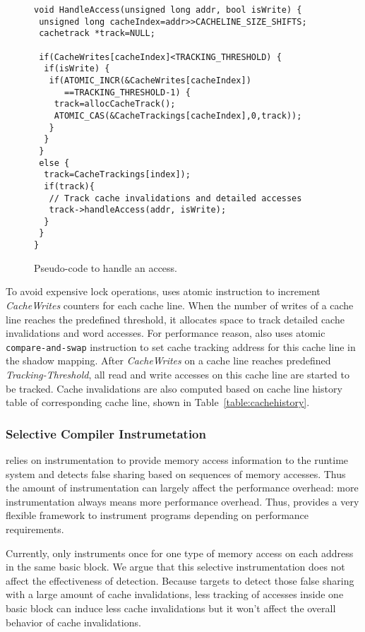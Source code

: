\begin{figure}[!t]
\begin{lstlisting}
void HandleAccess(unsigned long addr, bool isWrite) {
 unsigned long cacheIndex=addr>>CACHELINE_SIZE_SHIFTS;
 cachetrack *track=NULL;

 if(CacheWrites[cacheIndex]<TRACKING_THRESHOLD) {
  if(isWrite) {
   if(ATOMIC_INCR(&CacheWrites[cacheIndex]) 
      ==TRACKING_THRESHOLD-1) {
    track=allocCacheTrack();
    ATOMIC_CAS(&CacheTrackings[cacheIndex],0,track));
   }
  } 
 }
 else {
  track=CacheTrackings[index]);
  if(track){
   // Track cache invalidations and detailed accesses
   track->handleAccess(addr, isWrite);
  }
 }
}
\end{lstlisting}
\caption{Pseudo-code to handle an access.\label{fig:algorithm}}
\end{figure}

To avoid expensive lock operations,  uses atomic instruction to increment 
{\it CacheWrites} counters for each cache line. 
When the number of writes of a cache line reaches the predefined threshold,
it allocates space to track detailed cache invalidations and word accesses.
For performance reason,  also 
uses atomic \texttt{compare-and-swap} instruction to set cache tracking address for this cache line in
the shadow mapping.
After {\it CacheWrites} on a cache line reaches predefined {\it Tracking-Threshold}, 
all read and write accesses on this cache line are started to be tracked.
Cache invalidations are also computed based on cache line history table of corresponding
cache line, shown in Table~\ref{table:cachehistory}. 


\subsubsection{Selective Compiler Instrumetation}
 relies on instrumentation to provide memory access information to the runtime system 
and detects false sharing based on sequences of memory accesses. 
Thus the amount of instrumentation can largely affect the performance overhead: more 
instrumentation always means more performance overhead. 
Thus,  provides a very flexible framework to instrument programs 
depending on performance requirements. 

Currently, \Defaults{} only instruments once for one type of memory access on each address 
in the same basic block. 
We argue that this selective instrumentation does not affect the effectiveness of detection. 
Because \Defaults{} targets to detect those false sharing with a large amount of cache invalidations,
less tracking of accesses inside one basic block can induce less cache invalidations 
but it won't affect the overall behavior of cache invalidations. 


